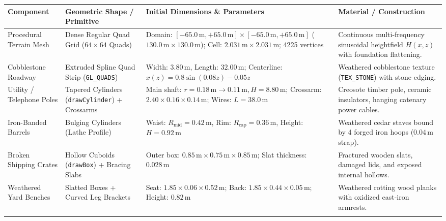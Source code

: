 \documentclass[10pt,a4paper,oneside]{article}
\begin{document}
\begin{longtable}{>{\raggedright\arraybackslash}p{}>{\raggedright\arraybackslash}p{}>{\raggedright\arraybackslash}p{}>{\raggedright\arraybackslash}p{}}
\toprule
\textbf{Component} & \textbf{Geometric Shape / Primitive} & \textbf{Initial Dimensions \& Parameters} & \textbf{Material / Construction} \\
\midrule
\endhead

Procedural Terrain Mesh & Dense Regular Quad Grid ($64\times 64$ Quads) & Domain: $[-65.0\,\mathrm{m}, +65.0\,\mathrm{m}] \times [-65.0\,\mathrm{m}, +65.0\,\mathrm{m}]$ ($130.0\,\mathrm{m} \times 130.0\,\mathrm{m}$); Cell: $2.031\,\mathrm{m} \times 2.031\,\mathrm{m}$; 4225 vertices & Continuous multi-frequency sinusoidal heightfield $H(x,z)$ with foundation flattening.\\\addlinespace[3pt]

Cobblestone Roadway & Extruded Spline Quad Strip (\texttt{GL\_QUADS}) & Width: $3.80\,\mathrm{m}$, Length: $32.00\,\mathrm{m}$; Centerline: $x(z) = 0.8\sin(0.08z) - 0.05z$ & Weathered cobblestone texture (\texttt{TEX\_STONE}) with stone edging.\\\addlinespace[3pt]

Utility / Telephone Poles & Tapered Cylinders (\texttt{drawCylinder}) + Crossarms & Main shaft: $r=0.18\,\mathrm{m}\to 0.11\,\mathrm{m}, H=8.80\,\mathrm{m}$; Crossarm: $2.40\times 0.16\times 0.14\,\mathrm{m}$; Wires: $L=38.0\,\mathrm{m}$ & Creosote timber pole, ceramic insulators, hanging catenary power cables.\\\addlinespace[3pt]

Iron-Banded Barrels & Bulging Cylinders (Lathe Profile) & Waist: $R_{\mathrm{mid}}=0.42\,\mathrm{m}$, Rim: $R_{\mathrm{cap}}=0.36\,\mathrm{m}$, Height: $H=0.92\,\mathrm{m}$ & Weathered cedar staves bound by 4 forged iron hoops ($0.04\,\mathrm{m}$ strap).\\\addlinespace[3pt]

Broken Shipping Crates & Hollow Cuboids (\texttt{drawBox}) + Bracing Slabs & Outer box: $0.85\,\mathrm{m} \times 0.75\,\mathrm{m} \times 0.85\,\mathrm{m}$; Slat thickness: $0.028\,\mathrm{m}$ & Fractured wooden slats, damaged lids, and exposed internal hollows.\\\addlinespace[3pt]

Weathered Yard Benches & Slatted Boxes + Curved Leg Brackets & Seat: $1.85\times 0.06\times 0.52\,\mathrm{m}$; Back: $1.85\times 0.44\times 0.05\,\mathrm{m}$; Height: $0.82\,\mathrm{m}$ & Weathered rotting wood planks with oxidized cast-iron armrests.\\\addlinespace[3pt]


\end{longtable}
\end{document}

